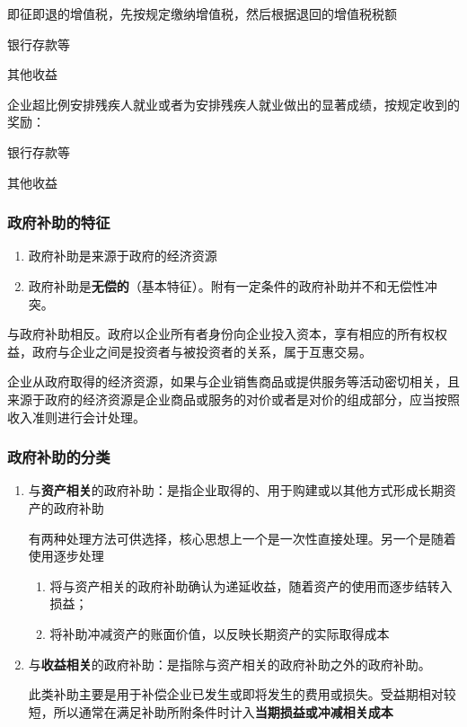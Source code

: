 \documentclass[UTF8,12pt]{ctexart}
\newenvironment{Dr}{%
	\begin{list}{}%
		{
			\setlength{\leftmargin}{2em}
			\setlength{\labelwidth}{2em}
			\setlength{\labelsep}{0pt}
			\setlength{\itemindent}{0pt}
			\setlength{\listparindent}{0pt}
			\setlength{\parsep}{0pt}
			\setlength{\topsep}{0pt}
		}
		\item[\textbf{借：}]
	}{%
	\end{list}
}
\newenvironment{Cr}{%
	\begin{list}{}%
		{
			\setlength{\leftmargin}{3em}
			\setlength{\labelwidth}{2em}
			\setlength{\labelsep}{0pt}
			\setlength{\itemindent}{0pt}
			\setlength{\listparindent}{0pt}
			\setlength{\parsep}{0pt}
			\setlength{\topsep}{0pt}
		}
		\item[\textbf{贷：}]
	}{%
	\end{list}
}
\numberwithin{equation}{section} %
\numberwithin{figure}{section}
\numberwithin{table}{section}
\begin{document}
	即征即退的增值税，先按规定缴纳增值税，然后根据退回的增值税税额
	\begin{Dr}
		银行存款等
	\end{Dr}
	\begin{Cr}
		其他收益
	\end{Cr}
	
	企业超比例安排残疾人就业或者为安排残疾人就业做出的显著成绩，按规定收到的奖励：
	\begin{Dr}
		银行存款等
	\end{Dr}
	\begin{Cr}
		其他收益
	\end{Cr}
	
	\subsubsection{政府补助的特征}
	\begin{enumerate}
		\item 政府补助是来源于政府的经济资源
		
		\item 政府补助是\textbf{无偿的}（基本特征）。附有一定条件的政府补助并不和无偿性冲突。
	\end{enumerate}
	
	与政府补助相反。政府以企业所有者身份向企业投入资本，享有相应的所有权权益，政府与企业之间是投资者与被投资者的关系，属于互惠交易。
	
	企业从政府取得的经济资源，如果与企业销售商品或提供服务等活动密切相关，且来源于政府的经济资源是企业商品或服务的对价或者是对价的组成部分，应当按照收入准则进行会计处理。
	
	\subsubsection{政府补助的分类}
	\begin{enumerate}
		\item 与\textbf{资产相关}的政府补助：是指企业取得的、用于购建或以其他方式形成长期资产的政府补助
		
		有两种处理方法可供选择，核心思想上一个是一次性直接处理。另一个是随着使用逐步处理
		\begin{enumerate}
			\item 将与资产相关的政府补助确认为递延收益，随着资产的使用而逐步结转入损益；
			
			\item 将补助冲减资产的账面价值，以反映长期资产的实际取得成本
		\end{enumerate}
		
		\item 与\textbf{收益相关}的政府补助：是指除与资产相关的政府补助之外的政府补助。
		
		此类补助主要是用于补偿企业已发生或即将发生的费用或损失。受益期相对较短，所以通常在满足补助所附条件时计入\textbf{当期损益或冲减相关成本}
	\end{enumerate}
	
\end{document}

